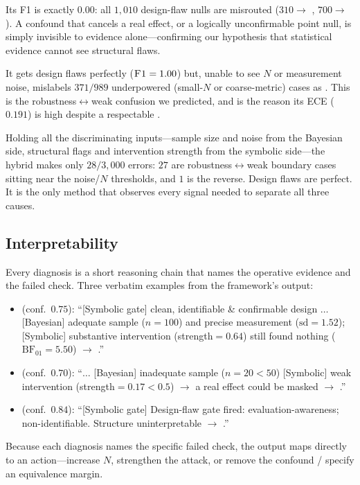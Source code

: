  Its \DF{} F1 is exactly $0.00$: all
$1{,}010$ design-flaw nulls are misrouted ($310 \rightarrow$ \GR,
$700 \rightarrow$ \WI). A confound that cancels a real effect, or a logically
unconfirmable point null, is simply invisible to evidence alone---confirming our
hypothesis that statistical evidence cannot see structural flaws.

 It gets design flaws perfectly
($\textsc{F1}=1.00$) but, unable to see $N$ or measurement noise, mislabels
$371/989$ underpowered (small-$N$ or coarse-metric) cases as \GR. This is the
robustness$\leftrightarrow$weak confusion we predicted, and is the reason its ECE
($0.191$) is high despite a respectable \macrofone.

 Holding all the discriminating inputs---sample
size and noise from the Bayesian side, structural flags and intervention strength
from the symbolic side---the hybrid makes only $28/3{,}000$ errors: $27$ are
robustness$\leftrightarrow$weak boundary cases sitting near the noise/$N$
thresholds, and $1$ is the reverse. Design flaws are perfect. It is the only method
that observes every signal needed to separate all three causes.

\subsection{Interpretability}
\label{sec:interp}

Every diagnosis is a short reasoning chain that names the operative evidence and
the failed check. Three verbatim examples from the framework's output:
\begin{itemize}[leftmargin=*,itemsep=2pt,topsep=2pt]
  \item \textbf{\GR{}} (conf.\ $0.75$): ``[Symbolic gate] clean, identifiable \&
        confirmable design $\ldots$ [Bayesian] adequate sample ($n{=}100$) and
        precise measurement ($\mathrm{sd}{=}1.52$); [Symbolic] substantive
        intervention (strength$=0.64$) still found nothing
        ($\mathrm{BF}_{01}{=}5.50$) $\rightarrow$ \GR.''
  \item \textbf{\WI{}} (conf.\ $0.70$): ``$\ldots$ [Bayesian] inadequate sample
        ($n{=}20 < 50$) [Symbolic] weak intervention (strength$=0.17 < 0.5$)
        $\rightarrow$ a real effect could be masked $\rightarrow$ \WI.''
  \item \textbf{\DF{}} (conf.\ $0.84$): ``[Symbolic gate] Design-flaw gate fired:
        evaluation-awareness; non-identifiable. Structure uninterpretable
        $\rightarrow$ \DF.''
\end{itemize}
Because each diagnosis names the specific failed check, the output maps directly
to an action---increase $N$, strengthen the attack, or remove the confound /
specify an equivalence margin.

